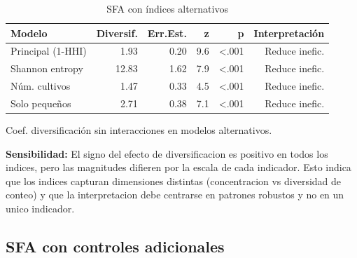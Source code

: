 \documentclass[10pt,a4paper]{article}
\begin{document}
\begin{table}[H]
\centering
\caption{SFA con índices alternativos}
\label{tab:sfa_robustness}
\begin{threeparttable}
\small
\begin{tabular}{lrrrrr}
\toprule
\textbf{Modelo} & \textbf{Diversif.} & \textbf{Err.Est.} & \textbf{z} & \textbf{p} & \textbf{Interpretación} \\
\midrule
Principal (1-HHI) & 1.93 & 0.20 & 9.6 & <.001 & Reduce inefic. \\
Shannon entropy & 12.83 & 1.62 & 7.9 & <.001 & Reduce inefic. \\
Núm. cultivos & 1.47 & 0.33 & 4.5 & <.001 & Reduce inefic. \\
Solo pequeños & 2.71 & 0.38 & 7.1 & <.001 & Reduce inefic. \\
\bottomrule
\end{tabular}
\begin{tablenotes}
\footnotesize
\item Coef. diversificación sin interacciones en modelos alternativos.
\end{tablenotes}
\end{threeparttable}
\end{table}

\textbf{Sensibilidad:} El signo del efecto de diversificacion es positivo en todos los indices, pero las magnitudes difieren por la escala de cada indicador. Esto indica que los indices capturan dimensiones distintas (concentracion vs diversidad de conteo) y que la interpretacion debe centrarse en patrones robustos y no en un unico indicador.

\subsection{SFA con controles adicionales}
\end{document}
